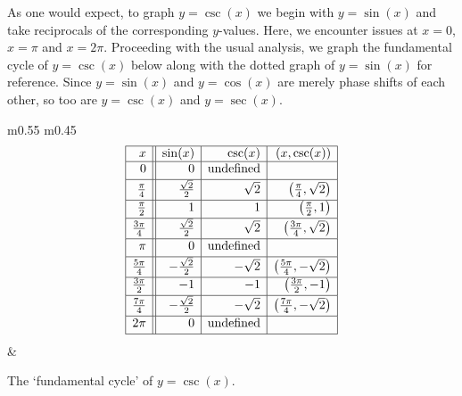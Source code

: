 \medskip

As one would expect, to graph $y = \csc(x)$ we begin with $y = \sin(x)$ and take reciprocals of the corresponding $y$-values.  Here, we encounter issues at $x = 0$, $x = \pi$ and $x = 2\pi$.  Proceeding with the usual analysis, we graph the fundamental cycle of $y = \csc(x)$ below along with the dotted graph of $y=\sin(x)$ for reference.  Since $y = \sin(x)$ and $y = \cos(x)$ are merely phase shifts of each other, so too are $y = \csc(x)$ and $y = \sec(x)$. 

\medskip

\noindent\hskip-10pt\begin{minipage}{\textwidth}
\begin{center}
\begin{tabular}{m{} m{}}
\setlength{\extrarowheight}{2pt}
\[ \begin{array}{|r||r|r|r|}  

\hline

 x & \sin(x) & \csc(x) & (x,\csc(x)) \\ \hline
0  & 0 & \text{undefined} &  \\ [2pt]   \hline
\frac{\pi}{4}  & \frac{\sqrt{2}}{2} & \sqrt{2} & \left(\frac{\pi}{4}, \sqrt{2} \right) \\ [2pt] \hline 
\frac{\pi}{2}  & 1 & 1 & \left(\frac{\pi}{2}, 1 \right) \\ [2pt] \hline 
\frac{3\pi}{4}  & \frac{\sqrt{2}}{2} & \sqrt{2} & \left(\frac{3\pi}{4}, \sqrt{2} \right) \\ [2pt] \hline 
\pi & 0 & \text{undefined} &   \\ [2pt] \hline 
\frac{5\pi}{4}  & -\frac{\sqrt{2}}{2} & -\sqrt{2} & \left(\frac{5\pi}{4}, -\sqrt{2} \right) \\ [2pt] \hline 
\frac{3\pi}{2}  & -1 & -1 & \left(\frac{3\pi}{2},-1 \right)\\ [2pt] \hline 
\frac{7\pi}{4}  & -\frac{\sqrt{2}}{2} & -\sqrt{2} & \left(\frac{7\pi}{4}, -\sqrt{2} \right) \\ [2pt] \hline 
2\pi  & 0 & \text{undefined} &  \\  [2pt] \hline
\end{array} \] \setlength{\extrarowheight}{0pt} &
\end{tabular}
\end{center}
\captionsetup{type=figure}
\caption{The `fundamental cycle' of $y = \csc(x)$.}\label{fig:cscgraph1}
\end{minipage}


